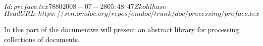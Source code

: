 \svnInfo $Id: preface.tex 7880 2008-07-28 05:48:47Z kohlhase $
\svnKeyword $HeadURL: https://svn.omdoc.org/repos/omdoc/trunk/doc/processing/preface.tex $

In \ifbook this part of the {\report}\else document\fi we will present an abstract library
for processing collections of {\omdoc} documents.

